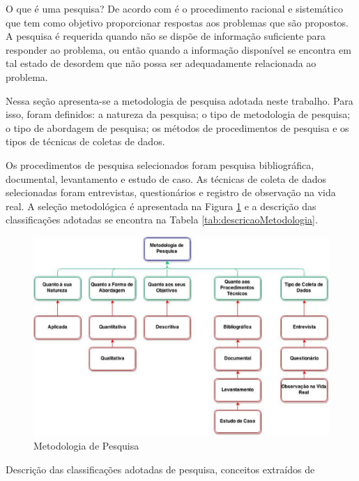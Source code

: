 O que é uma pesquisa? De acordo com \cite{gil_como_2002} é o procedimento racional e sistemático que tem como objetivo proporcionar respostas aos problemas que são propostos. A pesquisa é requerida quando não se dispõe de informação suficiente para responder ao
problema, ou então quando a informação disponível se encontra em tal estado de desordem que não possa ser adequadamente relacionada ao problema.

Nessa seção apresenta-se a metodologia de pesquisa adotada neste trabalho. Para
isso, foram definidos: a natureza da pesquisa; o tipo de metodologia de pesquisa; o tipo de abordagem de pesquisa; os métodos de procedimentos de pesquisa e os tipos de técnicas
de coletas de dados.

Os procedimentos de pesquisa selecionados foram pesquisa bibliográfica, documental, levantamento e estudo de caso. As técnicas de coleta de dados selecionadas foram
entrevistas, questionários e registro de observação na vida real. A seleção metodológica é apresentada na Figura \ref{7eixosqualidade} e a descrição das classificações adotadas se encontra na Tabela \ref{tab:descricaoMetodologia}.

\begin{figure}[h!]
\centering
\includegraphics[keepaspectratio=false,scale=0.5]{figuras/figuras_nilton/selecaoMetodologica.eps}
\caption{Metodologia de Pesquisa}
\label{7eixosqualidade}
\end{figure}

\begin{table}[!ht]
	\begin{center}
	
	 
	\caption{Descrição das classificações adotadas de pesquisa, conceitos extraídos de  }
	\label{tab:descricaoMetodologia}
	\end{center}
	\end{table}	
	\FloatBarrier

